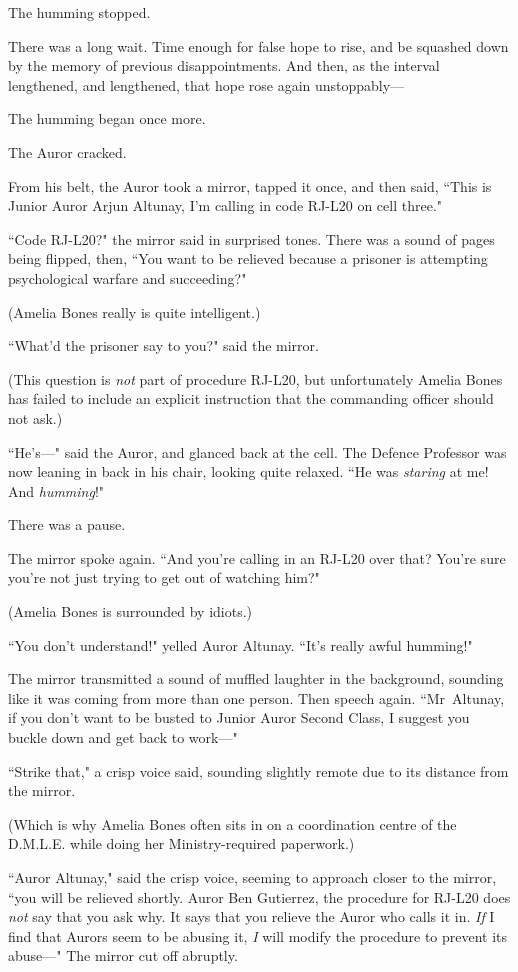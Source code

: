 The humming stopped.

There was a long wait. Time enough for false hope to rise, and be squashed down by the memory of previous disappointments. And then, as the interval lengthened, and lengthened, that hope rose again unstoppably—

The humming began once more.

The Auror cracked.

From his belt, the Auror took a mirror, tapped it once, and then said, ``This is Junior Auror Arjun Altunay, I'm calling in code RJ-L20 on cell three."

``Code RJ-L20?" the mirror said in surprised tones. There was a sound of pages being flipped, then, ``You want to be relieved because a prisoner is attempting psychological warfare and succeeding?"

(Amelia Bones really is quite intelligent.)

``What'd the prisoner say to you?" said the mirror.

(This question is \emph{not} part of procedure RJ-L20, but unfortunately Amelia Bones has failed to include an explicit instruction that the commanding officer should not ask.)

``He's—" said the Auror, and glanced back at the cell. The Defence Professor was now leaning in back in his chair, looking quite relaxed. ``He was \emph{staring} at me! And \emph{humming}!"

There was a pause.

The mirror spoke again. ``And you're calling in an RJ-L20 over that? You're sure you're not just trying to get out of watching him?"

(Amelia Bones is surrounded by idiots.)

``You don't understand!" yelled Auror Altunay. ``It's really awful humming!"

The mirror transmitted a sound of muffled laughter in the background, sounding like it was coming from more than one person. Then speech again. ``Mr~Altunay, if you don't want to be busted to Junior Auror Second Class, I suggest you buckle down and get back to work—"

``Strike that," a crisp voice said, sounding slightly remote due to its distance from the mirror.

(Which is why Amelia Bones often sits in on a coordination centre of the D.M.L.E. while doing her Ministry-required paperwork.)

``Auror Altunay," said the crisp voice, seeming to approach closer to the mirror, ``you will be relieved shortly. Auror Ben Gutierrez, the procedure for RJ-L20 does \emph{not} say that you ask why. It says that you relieve the Auror who calls it in. \emph{If} I find that Aurors seem to be abusing it, \emph{I} will modify the procedure to prevent its abuse—" The mirror cut off abruptly.

